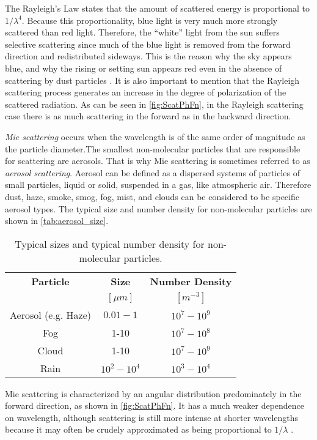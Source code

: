 The Rayleigh's Law states that the amount of scattered energy is proportional to $1/\lambda^4$. Because this proportionality, blue light is very much more strongly scattered than red light. Therefore, the ``white'' light from the sun suffers selective scattering since much of the blue light is removed from the forward direction and redistributed  sideways. This is the reason why the sky appears blue, and why the rising or setting sun appears red even in the absence of scattering by dust particles \cite{Rees1990}. It is also important to mention that the Rayleigh scattering process generates an increase in the degree of polarization of the scattered radiation. As can be seen in \autoref{fig:ScatPhFn}, in the Rayleigh scattering case there is as much scattering in the forward as in the backward direction. 

{\it Mie scattering} occurs when the wavelength is of the same order of magnitude as the particle diameter.The smallest non-molecular particles that are responsible for scattering are aerosols. That is why Mie scattering is sometimes referred to as {\it aerosol scattering}. Aerosol can be defined as a dispersed systems of particles of small particles, liquid or solid, suspended in a gas, like atmospheric air. Therefore dust, haze, smoke, smog, fog, mist, and clouds can be considered to be specific aerosol types. The typical size and number density for non-molecular particles are shown in \autoref{tab:aerosol_size}.

\begin{table}[htb]
\caption{ Typical sizes and typical number density for non-molecular particles. \label{tab:aerosol_size} } 
\centering
\begin{tabular}{c|c|c}
          \bfseries{Particle}   & \bfseries{Size}  & \bfseries{Number Density} \\ 
  & $[\mu m]$     & $[m^{-3}]$      \\ \hline \hline
    Aerosol (e.g. Haze) & $0.01-1$  &   $10^7-10^9$   \\
    Fog     & 1-10    & $10^7-10^8$   \\
    Cloud     & 1-10    & $10^7-10^9$   \\
    Rain    & $10^2-10^4$   & $10^3-10^4$   \\   
 \end{tabular}
\end{table}

Mie scattering is characterized by an angular distribution predominately in the forward direction, as shown in \autoref{fig:ScatPhFn}. It has a much weaker dependence on wavelength, although scattering is still more intense at shorter wavelengths because it may often be crudely approximated as being proportional to $1/\lambda$ \cite{Rees1990}.

